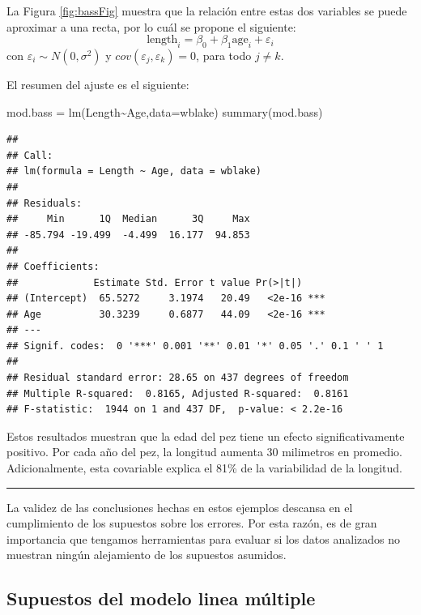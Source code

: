 \documentclass[
]{article}
\newenvironment{Shaded}{\begin{snugshade}}{\end{snugshade}}
\newcommand{\AttributeTok}[1]{\textcolor[rgb]{0.77,0.63,0.00}{#1}}
\newcommand{\FunctionTok}[1]{\textcolor[rgb]{0.00,0.00,0.00}{#1}}
\newcommand{\NormalTok}[1]{#1}
\newcommand{\OtherTok}[1]{\textcolor[rgb]{0.56,0.35,0.01}{#1}}
\newcommand{\SpecialCharTok}[1]{\textcolor[rgb]{0.00,0.00,0.00}{#1}}
\begin{document}
La Figura \ref{fig:bassFig} muestra que la relación entre estas dos variables se puede aproximar a una recta, por lo cuál se propone el siguiente:
\[
\mbox{length}_{i} = \beta_{0} + \beta_{1}\mbox{age}_{i} + \varepsilon_{i}
\]
con \(\varepsilon_{i} \sim N\left(0,\sigma^{2} \right)\) y \(cov(\varepsilon_{j},\varepsilon_{k})=0\), para todo \(j \neq k\).

El resumen del ajuste es el siguiente:

\begin{Shaded}
\begin{Highlighting}[]
\NormalTok{mod.bass }\OtherTok{=} \FunctionTok{lm}\NormalTok{(Length}\SpecialCharTok{\textasciitilde{}}\NormalTok{Age,}\AttributeTok{data=}\NormalTok{wblake)}
\FunctionTok{summary}\NormalTok{(mod.bass)}
\end{Highlighting}
\end{Shaded}

\begin{verbatim}
## 
## Call:
## lm(formula = Length ~ Age, data = wblake)
## 
## Residuals:
##     Min      1Q  Median      3Q     Max 
## -85.794 -19.499  -4.499  16.177  94.853 
## 
## Coefficients:
##             Estimate Std. Error t value Pr(>|t|)    
## (Intercept)  65.5272     3.1974   20.49   <2e-16 ***
## Age          30.3239     0.6877   44.09   <2e-16 ***
## ---
## Signif. codes:  0 '***' 0.001 '**' 0.01 '*' 0.05 '.' 0.1 ' ' 1
## 
## Residual standard error: 28.65 on 437 degrees of freedom
## Multiple R-squared:  0.8165, Adjusted R-squared:  0.8161 
## F-statistic:  1944 on 1 and 437 DF,  p-value: < 2.2e-16
\end{verbatim}

Estos resultados muestran que la edad del pez tiene un efecto significativamente positivo. Por cada año del pez, la longitud aumenta 30 milimetros en promedio. Adicionalmente, esta covariable explica el 81\% de la variabilidad de la longitud.

\rule{\textwidth}{0.4pt}

La validez de las conclusiones hechas en estos ejemplos descansa en el cumplimiento de los supuestos sobre los errores. Por esta razón, es de gran importancia que tengamos herramientas para evaluar si los datos analizados no muestran ningún alejamiento de los supuestos asumidos.

\hypertarget{supuestos-del-modelo-linea-muxfaltiple}{%
\subsection{Supuestos del modelo linea múltiple}\label{supuestos-del-modelo-linea-muxfaltiple}}
\end{document}
